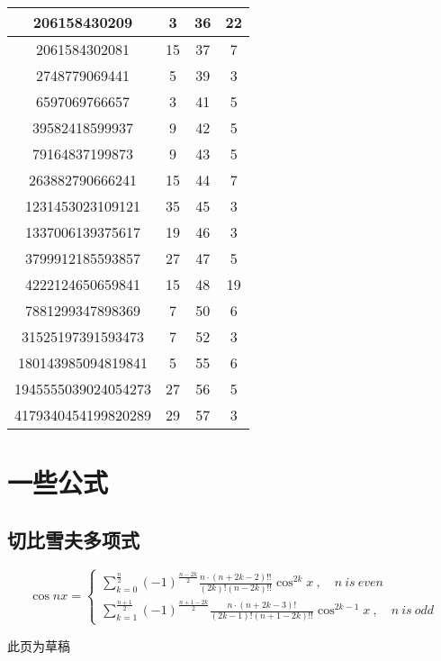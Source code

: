 \begin{table}[!htbp]
\begin{tabular}{|c|c|c|c|}
206158430209        & 3   & 36 & 22    \\ \hline
2061584302081       & 15  & 37 & 7     \\ \hline
2748779069441       & 5   & 39 & 3     \\ \hline
6597069766657       & 3   & 41 & 5     \\ \hline
39582418599937      & 9   & 42 & 5     \\ \hline
79164837199873      & 9   & 43 & 5     \\ \hline
263882790666241     & 15  & 44 & 7     \\ \hline
1231453023109121    & 35  & 45 & 3     \\ \hline
1337006139375617    & 19  & 46 & 3     \\ \hline
3799912185593857    & 27  & 47 & 5     \\ \hline
4222124650659841    & 15  & 48 & 19    \\ \hline
7881299347898369    & 7   & 50 & 6     \\ \hline
31525197391593473   & 7   & 52 & 3     \\ \hline
180143985094819841  & 5   & 55 & 6     \\ \hline
1945555039024054273 & 27  & 56 & 5     \\ \hline
4179340454199820289 & 29  & 57 & 3     \\ \hline
\end{tabular}
\end{table}

\section{一些公式}
\subsection{切比雪夫多项式}
$$
\cos n x=\left\{\begin{array}{l}{\sum_{k=0}^{\frac{n}{2}}(-1)^{\frac{n-2 k}{2}} \frac{n \cdot(n+2 k-2) ! !}{(2 k) !(n-2 k) ! !} \cos ^{2 k} x} \ , \quad  n\ is\ even \\
 {\sum_{k=1}^{\frac{n+1}{2}}(-1)^{\frac{n+1-2 k}{2}} \frac{n \cdot(n+2 k-3) !}{(2 k-1) !(n+1-2 k) ! !} \cos ^{2 k-1} x} \ , \quad  n\ is\ odd  \end{array}\right.
$$


\newpage

此页为草稿